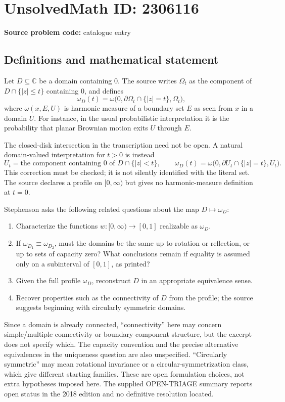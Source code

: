\documentclass[11pt]{article}
\newcommand{\C}{\mathbb{C}}
\begin{document}
\section*{UnsolvedMath ID: 2306116}
\textbf{Source problem code:} catalogue entry
\subsection{Definitions and mathematical statement}
Let \(D\subseteq\C\) be a domain containing \(0\). The source writes \(\Omega_t\) as the component of \(D\cap\{|z|\le t\}\) containing \(0\), and defines
\[
\omega_D(t)=\omega\bigl(0,\partial\Omega_t\cap\{|z|=t\},\Omega_t\bigr),
\]
where \(\omega(x,E,U)\) is harmonic measure of a boundary set \(E\) as seen from \(x\) in a domain \(U\). For instance, in the usual probabilistic interpretation it is the probability that planar Brownian motion exits \(U\) through \(E\).

The closed-disk intersection in the transcription need not be open. A natural domain-valued interpretation for \(t>0\) is instead
\[
U_t=\text{the component containing }0\text{ of }D\cap\{|z|<t\},
\qquad
\omega_D(t)=\omega\bigl(0,\partial U_t\cap\{|z|=t\},U_t\bigr).
\]
This correction must be checked; it is not silently identified with the literal set. The source declares a profile on \([0,\infty)\) but gives no harmonic-measure definition at \(t=0\).

Stephenson asks the following related questions about the map \(D\mapsto\omega_D\):
\begin{enumerate}
\item Characterize the functions \(w:[0,\infty)\to[0,1]\) realizable as \(\omega_D\).
\item If \(\omega_{D_1}\equiv\omega_{D_2}\), must the domains be the same up to rotation or reflection, or up to sets of capacity zero? What conclusions remain if equality is assumed only on a subinterval of \([0,1]\), as printed?
\item Given the full profile \(\omega_D\), reconstruct \(D\) in an appropriate equivalence sense.
\item Recover properties such as the connectivity of \(D\) from the profile; the source suggests beginning with circularly symmetric domains.
\end{enumerate}
Since a domain is already connected, ``connectivity'' here may concern simple/multiple connectivity or boundary-component structure, but the excerpt does not specify which. The capacity convention and the precise alternative equivalences in the uniqueness question are also unspecified. ``Circularly symmetric'' may mean rotational invariance or a circular-symmetrization class, which give different starting families. These are open formulation choices, not extra hypotheses imposed here. The supplied OPEN-TRIAGE summary reports open status in the 2018 edition and no definitive resolution located.
\end{document}
